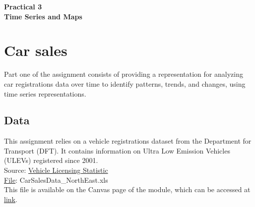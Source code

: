 \documentclass[11pt]{article}
\begin{document}
\pagestyle{fancy}
\renewcommand{\headrulewidth}{0pt}
\fancyfoot[L]{\thepage}
\fancyfoot[C]{}

\begin{center}
\vspace*{1cm}
{\textbf {\Huge Practical 3}}\\
\vspace*{0.5cm}
{\textbf {\huge Time Series and Maps}}
\vspace*{1cm}
\end{center}

\section{Car sales}

Part one of the assignment consists of providing a representation for analyzing car registrations data over time to identify patterns, trends, and changes, using time series representations.

\subsection*{Data}

This assignment relies on a vehicle registrations dataset from the Department for Transport (DFT). It contains information on Ultra Low Emission Vehicles (ULEVs) registered since 2001.\\
Source: \href{https://www.gov.uk/government/collections/vehicles-statistics}{Vehicle Licensing Statistic}\\

\underline{File}: CarSalesData\_NorthEast.xls\\
This file is available on the Canvas page of the module, which can be accessed at \href{https://ncl.instructure.com/courses/49730}{link}.\\
\end{document}
